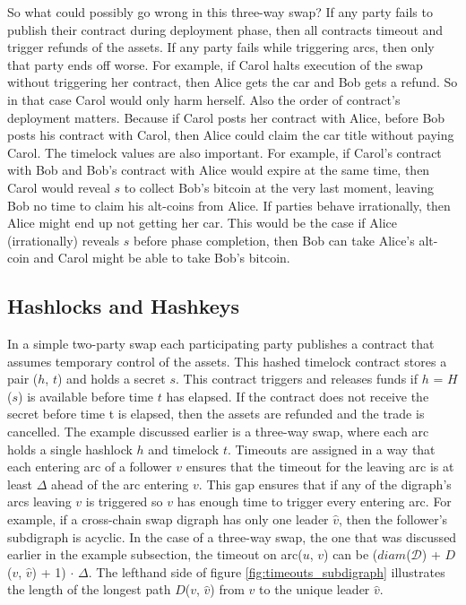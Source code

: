 So what could possibly go wrong in this three-way swap? If any party fails to publish their contract during deployment phase, then all contracts timeout and trigger refunds of the assets. If any party fails while triggering arcs, then only that party ends off worse. For example, if Carol halts execution of the swap without triggering her contract, then Alice gets the car and Bob gets a refund. So in that case Carol would only harm herself. Also the order of contract's deployment matters. Because if Carol posts her contract with Alice, before Bob posts his contract with Carol, then Alice could claim the car title without paying Carol. The timelock values are also important. For example, if Carol's contract with Bob and Bob's contract with Alice would expire at the same time, then Carol would reveal $s$ to collect Bob's bitcoin at the very last moment, leaving Bob no time to claim his alt-coins from Alice. If parties behave irrationally, then Alice might end up not getting her car. This would be the case if Alice (irrationally) reveals $s$ before phase completion, then Bob can take Alice's alt-coin and Carol might be able to take Bob's bitcoin.


\subsection{Hashlocks and Hashkeys}
\label{subsec:background:second_section:hashlock_timelock}
In a simple two-party swap each participating party publishes a contract that assumes temporary control of the assets. This hashed timelock contract \cite{hashedtimelock} stores a pair ($h$, $t$) and holds a secret $s$. This contract triggers and releases funds if $h$ = $H$($s$) is available before time $t$ has elapsed. If the contract does not receive the secret before time t is elapsed, then the assets are refunded and the trade is cancelled. The example discussed earlier is a three-way swap, where each arc holds a single hashlock $h$ and timelock $t$. Timeouts are assigned in a way that each entering arc of a follower $v$ ensures that the timeout for the leaving arc is at least $\Delta$ ahead of the arc entering $v$. This gap ensures that if any of the digraph's arcs leaving $v$ is triggered so $v$ has enough time to trigger every entering arc. For example, if a cross-chain swap digraph has only one leader $\hat{v}$, then the follower's subdigraph is acyclic. In the case of a three-way swap, the one that was discussed earlier in the example subsection, the timeout on arc($u$, $v$) can be ($diam$($\mathcal{D}$) + $D$($v$, $\hat{v}$) + 1) $\cdot$ $\Delta$. The lefthand side of figure \ref{fig:timeouts_subdigraph} illustrates the length of the longest path $D$($v$, $\hat{v}$) from $v$ to the unique leader $\hat{v}$.


